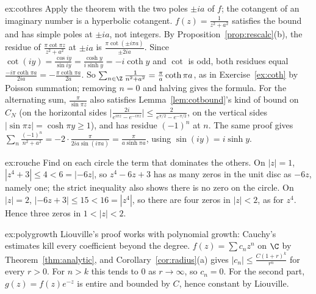 \begin{solution}{ex:cothres}
\idea Apply the theorem with the two poles $\pm ia$ of $f$; the cotangent of an imaginary number is a hyperbolic cotangent.
\writeup $f(z)=\frac1{z^2+a^2}$ satisfies the bound and has simple poles at $\pm ia$, not integers. By Proposition~\ref{prop:rescalc}(b), the residue of
$\frac{\pi\cot\pi z}{z^2+a^2}$ at $\pm ia$ is $\frac{\pi\cot(\pm i\pi a)}{\pm2ia}$. Since $\cot(iy)=\frac{\cos iy}{\sin iy}=\frac{\cosh y}{i\sinh y}=-i\coth y$ and $\cot$ is odd, both residues equal
$\frac{-i\pi\coth\pi a}{2ia}=-\frac{\pi\coth\pi a}{2a}$. So $\sum_{n\in\Z}\frac1{n^2+a^2}=\frac\pi a\coth\pi a$, as in Exercise~\ref{ex:coth} by Poisson summation; removing $n=0$ and halving gives
the formula. For the alternating sum, $\frac\pi{\sin\pi z}$ also satisfies Lemma~\ref{lem:cotbound}'s kind of bound on $C_N$ (on the horizontal sides
$\bigl|\frac{2i}{e^{i\pi z}-e^{-i\pi z}}\bigr|\le\frac2{e^{\pi/2}-e^{-\pi/2}}$, on the vertical sides $|\sin\pi z|=\cosh\pi y\ge1$), and has residue $(-1)^n$ at $n$. The same proof gives
$\sum_n\frac{(-1)^n}{n^2+a^2}=-2\cdot\frac{\pi}{2ia\sin(i\pi a)}=\frac\pi{a\sinh\pi a}$, using $\sin(iy)=i\sinh y$.
\end{solution}

\begin{solution}{ex:rouche}
\idea Find on each circle the term that dominates the others.
\writeup On $|z|=1$, $|z^4+3|\le4<6=|-6z|$, so $z^4-6z+3$ has as many zeros in the unit disc as $-6z$, namely one; the strict inequality also shows
there is no zero on the circle. On $|z|=2$, $|-6z+3|\le15<16=|z^4|$, so there are four zeros in $|z|<2$, as for $z^4$. Hence three zeros in $1<|z|<2$.
\end{solution}

\begin{solution}{ex:polygrowth}
\idea Liouville's proof works with polynomial growth: Cauchy's estimates kill every coefficient beyond the degree.
\writeup $f(z)=\sum c_nz^n$ on $\C$ by Theorem~\ref{thm:analytic}, and Corollary~\ref{cor:radius}(a) gives $|c_n|\le\frac{C(1+r)^k}{r^n}$ for every $r>0$. For $n>k$ this tends to $0$ as
$r\to\infty$, so $c_n=0$. For the second part, $g(z)=f(z)e^{-z}$ is entire and bounded by $C$, hence constant by Liouville.
\end{solution}

